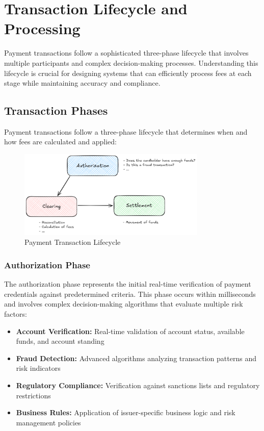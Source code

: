 \section{Transaction Lifecycle and Processing}

Payment transactions follow a sophisticated three-phase lifecycle that involves multiple participants and complex decision-making processes. Understanding this lifecycle is crucial for designing systems that can efficiently process fees at each stage while maintaining accuracy and compliance.

\subsection{Transaction Phases}

Payment transactions follow a three-phase lifecycle that determines when and how fees are calculated and applied:

\begin{figure}[H]
    \centering
    \includegraphics[width=0.8\textwidth]{img/Txn_Phases.png}
    \caption{Payment Transaction Lifecycle}
\end{figure}

\subsubsection{Authorization Phase}

The authorization phase represents the initial real-time verification of payment credentials against predetermined criteria. This phase occurs within milliseconds and involves complex decision-making algorithms that evaluate multiple risk factors:

\begin{itemize}
   \item \textbf{Account Verification:} Real-time validation of account status, available funds, and account standing
   \item \textbf{Fraud Detection:} Advanced algorithms analyzing transaction patterns and risk indicators
   \item \textbf{Regulatory Compliance:} Verification against sanctions lists and regulatory restrictions
   \item \textbf{Business Rules:} Application of issuer-specific business logic and risk management policies
\end{itemize}

